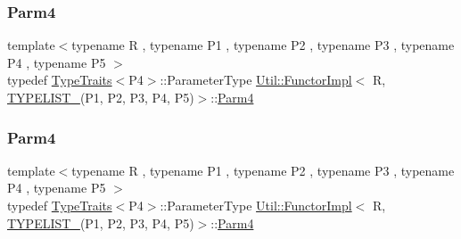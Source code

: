 \mbox{\label{classUtil_1_1FunctorImpl_3_01R_00_01TYPELIST__5_07P1_00_01P2_00_01P3_00_01P4_00_01P5_08_4_a9fb458de88c9f2050fd168a315f93033}} 
\subsubsection{\texorpdfstring{Parm4}{Parm4}\hspace{0.1cm}{\footnotesize\ttfamily [2/3]}}
{\footnotesize\ttfamily template$<$typename R , typename P1 , typename P2 , typename P3 , typename P4 , typename P5 $>$ \\
typedef \mbox{\hyperlink{classUtil_1_1TypeTraits}{Type\+Traits}}$<$P4$>$\+::Parameter\+Type \mbox{\hyperlink{classUtil_1_1FunctorImpl}{Util\+::\+Functor\+Impl}}$<$ R, \mbox{\hyperlink{adat__devel__install_2include_2adat_2typelist_8h_aad5d9b3c82c8503c85c625acd41c0a2f}{T\+Y\+P\+E\+L\+I\+S\+T\+\_}}(P1, P2, P3, P4, P5)$>$\+::\mbox{\hyperlink{structUtil_1_1Private_1_1FunctorImplBase_a1ad7fe3f243480c44a610927ebe76762}{Parm4}}}

\mbox{\label{classUtil_1_1FunctorImpl_3_01R_00_01TYPELIST__5_07P1_00_01P2_00_01P3_00_01P4_00_01P5_08_4_a9fb458de88c9f2050fd168a315f93033}} 
\subsubsection{\texorpdfstring{Parm4}{Parm4}\hspace{0.1cm}{\footnotesize\ttfamily [3/3]}}
{\footnotesize\ttfamily template$<$typename R , typename P1 , typename P2 , typename P3 , typename P4 , typename P5 $>$ \\
typedef \mbox{\hyperlink{classUtil_1_1TypeTraits}{Type\+Traits}}$<$P4$>$\+::Parameter\+Type \mbox{\hyperlink{classUtil_1_1FunctorImpl}{Util\+::\+Functor\+Impl}}$<$ R, \mbox{\hyperlink{adat__devel__install_2include_2adat_2typelist_8h_aad5d9b3c82c8503c85c625acd41c0a2f}{T\+Y\+P\+E\+L\+I\+S\+T\+\_}}(P1, P2, P3, P4, P5)$>$\+::\mbox{\hyperlink{structUtil_1_1Private_1_1FunctorImplBase_a1ad7fe3f243480c44a610927ebe76762}{Parm4}}}

